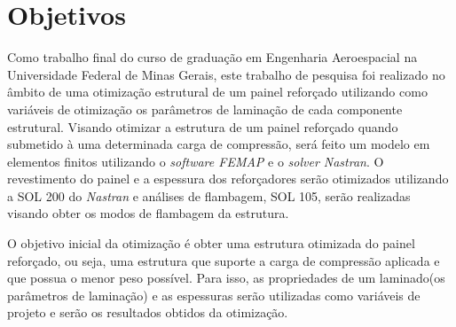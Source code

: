 \chapter{Objetivos}

Como trabalho final do curso de graduação em Engenharia Aeroespacial na Universidade Federal de Minas Gerais, este trabalho de pesquisa foi realizado no âmbito de uma otimização estrutural de um painel reforçado utilizando como variáveis de otimização os parâmetros de laminação de cada componente estrutural.
Visando otimizar a estrutura de um painel reforçado quando submetido à uma determinada carga de compressão, será feito um modelo em elementos finitos utilizando o \emph{software FEMAP} e o \emph{solver Nastran}. O revestimento do painel e a espessura dos reforçadores serão otimizados utilizando a SOL 200 do \emph{Nastran} e análises de flambagem, SOL 105, serão realizadas visando obter os modos de flambagem da estrutura.

O objetivo inicial da otimização é obter uma estrutura otimizada do painel reforçado, ou seja, uma estrutura que suporte a carga de compressão aplicada e que possua o menor peso possível. Para isso, as propriedades de um laminado(os parâmetros de laminação) e as espessuras serão utilizadas como variáveis de projeto e serão os resultados obtidos da otimização.
